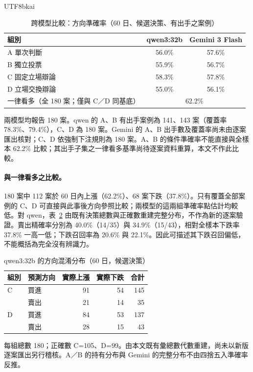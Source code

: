 \documentclass[12pt,a4paper]{article}
\newcommand{\grp}[1]{\textsf{#1}}
\begin{document}
\begin{CJK}{UTF8}{bkai}
\begin{table}[H]
\centering\small
\caption{跨模型比較：方向準確率（60 日、候選決策、有出手之案例）}
\label{tab:flash}
\begin{tabular}{@{}lcc@{}}
\toprule
組別 & qwen3:32b & Gemini 3 Flash \\
\midrule
\grp{A} 單次判斷 & 56.0\% & 57.6\% \\
\grp{B} 獨立投票 & 55.9\% & 56.7\% \\
\grp{C} 固定立場辯論 & 58.3\% & 57.8\% \\
\grp{D} 立場交換辯論 & 55.0\% & 56.1\% \\
\midrule
一律看多（全 180 案；僅與 C／D 同基底） & \multicolumn{2}{c}{62.2\%} \\
\bottomrule
\end{tabular}
\par\smallskip
\raggedright\footnotesize 兩模型均報告 180 案。qwen 的 A、B 有出手案例為 141、143 案（覆蓋率 78.3\%、79.4\%），C、D 為 180 案。Gemini 的 A、B 出手數及覆蓋率尚未由逐案匯出核對；C、D 依強制下注規則為 180 案。A、B 的條件準確率不能直接與全樣本 62.2\% 比較；其出手子集之一律看多基準尚待逐案資料重算，本文不作此比較。
\end{table}

\paragraph{與一律看多之比較。} 180 案中 112 案於 60 日內上漲（62.2\%）、68 案下跌（37.8\%）。只有覆蓋全部案例的 \grp{C}、\grp{D} 可直接與此事後方向參照比較；兩模型的這兩組準確率點估計均較低。對 qwen，表~\ref{tab:confusion} 由既有決策總數與正確數重建完整分布，不作為新的逐案驗證。賣出精確率分別為 40.0\%（14/35）與 34.9\%（15/43），相對全樣本下跌率 37.8\% 一高一低；下跌召回率為 20.6\% 與 22.1\%。因此可描述其下跌召回偏低，不能概括為完全沒有辨識力。

\begin{table}[H]
\centering\small
\caption{qwen3:32b 的方向混淆分布（60 日，候選決策）}
\label{tab:confusion}
\begin{tabular}{@{}llrrr@{}}
\toprule
組別 & 預測方向 & 實際上漲 & 實際下跌 & 合計 \\
\midrule
\grp{C} & 買進 & 91 & 54 & 145 \\
         & 賣出 & 21 & 14 & 35 \\
\grp{D} & 買進 & 84 & 53 & 137 \\
         & 賣出 & 28 & 15 & 43 \\
\bottomrule
\end{tabular}
\par\smallskip
\raggedright\footnotesize 每組總數 180；正確數 C=105、D=99。由本文既有彙總數代數重建，尚未以新版逐案匯出另行稽核。A／B 的持有分布與 Gemini 的完整分布不由四捨五入準確率反推。
\end{table}


\end{CJK}
\end{document}
